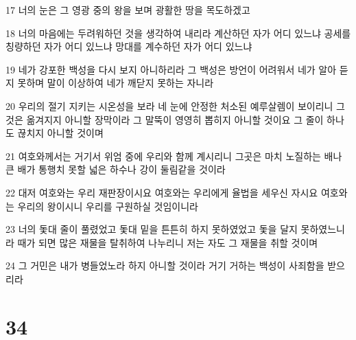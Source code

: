 \par 17 너의 눈은 그 영광 중의 왕을 보며 광활한 땅을 목도하겠고
\par 18 너의 마음에는 두려워하던 것을 생각하여 내리라 계산하던 자가 어디 있느냐 공세를 칭량하던 자가 어디 있느냐 망대를 계수하던 자가 어디 있느냐
\par 19 네가 강포한 백성을 다시 보지 아니하리라 그 백성은 방언이 어려워서 네가 알아 듣지 못하며 말이 이상하여 네가 깨닫지 못하는 자니라
\par 20 우리의 절기 지키는 시온성을 보라 네 눈에 안정한 처소된 예루살렘이 보이리니 그것은 옮겨지지 아니할 장막이라 그 말뚝이 영영히 뽑히지 아니할 것이요 그 줄이 하나도 끊치지 아니할 것이며
\par 21 여호와께서는 거기서 위엄 중에 우리와 함께 계시리니 그곳은 마치 노질하는 배나 큰 배가 통행치 못할 넓은 하수나 강이 둘림같을 것이라
\par 22 대저 여호와는 우리 재판장이시요 여호와는 우리에게 율법을 세우신 자시요 여호와는 우리의 왕이시니 우리를 구원하실 것임이니라
\par 23 너의 돛대 줄이 풀렸었고 돛대 밑을 튼튼히 하지 못하였었고 돛을 달지 못하였느니라 때가 되면 많은 재물을 탈취하여 나누리니 저는 자도 그 재물을 취할 것이며
\par 24 그 거민은 내가 병들었노라 하지 아니할 것이라 거기 거하는 백성이 사죄함을 받으리라

\chapter{34}

